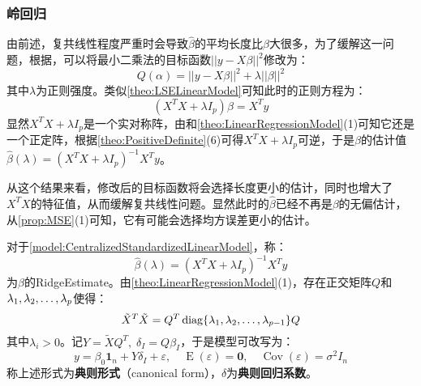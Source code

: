 \subsubsection{岭回归}
\begin{note}
	由前述，复共线性程度严重时会导致$\hat{\beta}$的平均长度比$\beta$大很多，为了缓解这一问题，根据，可以将最小二乘法的目标函数$||y-X\beta||^2$修改为：
	\begin{equation*}
		Q(\alpha)=||y-X\beta||^2+\lambda||\beta||^2
	\end{equation*}
	其中$\lambda$为正则强度。类似\cref{theo:LSELinearModel}可知此时的正则方程为：
	\begin{equation*}
		(X^TX+\lambda I_{p})\beta=X^Ty
	\end{equation*}
	显然$X^TX+\lambda I_{p}$是一个实对称阵，由和\cref{theo:LinearRegressionModel}(1)可知它还是一个正定阵，根据\cref{theo:PositiveDefinite}(6)可得$X^TX+\lambda I_{p}$可逆，于是$\beta$的估计值$\hat{\beta}(\lambda)=(X^TX+\lambda I_{p})^{-1}X^Ty$。\par
	从这个结果来看，修改后的目标函数将会选择长度更小的估计，同时也增大了$X^TX$的特征值，从而缓解复共线性问题。显然此时的$\hat{\beta}$已经不再是$\beta$的无偏估计，从\cref{prop:MSE}(1)可知，它有可能会选择均方误差更小的估计。
\end{note}
\begin{definition}
	对于\cref{model:CentralizedStandardizedLinearModel}，称：
	\begin{equation*}
		\hat{\beta}(\lambda)=(X^TX+\lambda I_p)^{-1}X^Ty
	\end{equation*}
	为$\beta$的\gls{RidgeEstimate}。由\cref{theo:LinearRegressionModel}(1)，存在正交矩阵$Q$和$\lambda_1, \lambda_2, \dots, \lambda_{p}$使得：
	\begin{equation*}
		\tilde{X}^T\tilde{X}=Q^T\operatorname{diag}\{\lambda_1, \lambda_2, \dots, \lambda_{p-1}\}Q
	\end{equation*}
	其中$\lambda_i>0$。记$Y=\tilde{X}Q^T,\;\delta_I=Q\beta_I$，于是模型可改写为：
	\begin{equation*}
		y=\beta_0\mathbf{1}_n+Y\delta_I+\varepsilon,\quad\operatorname{E}(\varepsilon)=\mathbf{0},\quad\operatorname{Cov}(\varepsilon)=\sigma^2I_n
	\end{equation*}
	称上述形式为\textbf{典则形式}（canonical form），$\delta$为\textbf{典则回归系数}。
\end{definition}
